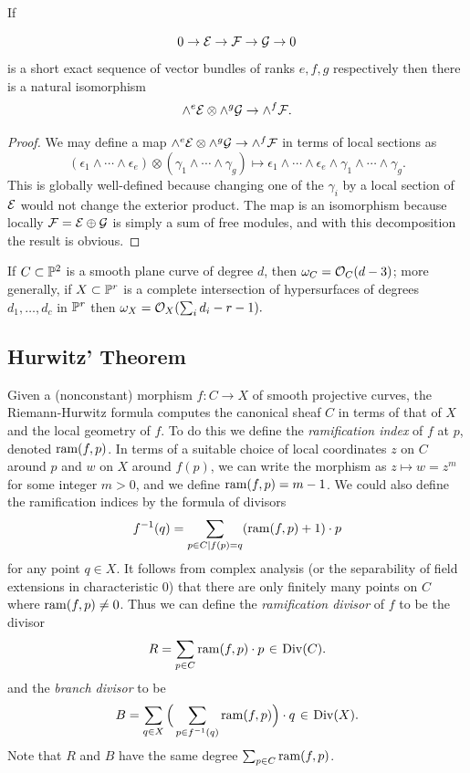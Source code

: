 \begin{lemma}\label{exterior powers}
 If 
\end{lemma}
$$
0\to {\mathcal E} \to {\mathcal F}\to {\mathcal G} \to 0
$$
is a short exact sequence of vector bundles of ranks $e,f,g$ respectively then there is a natural
isomorphism 
$$
\wedge^e{\mathcal E} \otimes \wedge^g {\mathcal G} \to \wedge^f{\mathcal F}.
$$
\begin{proof}
 We may define a map
$
\wedge^e{\mathcal E} \otimes \wedge^g {\mathcal G} \to \wedge^f{\mathcal F}
$
in terms of local sections as
$$
(\epsilon_1\wedge\cdots \wedge \epsilon_e) \otimes (\gamma_1\wedge\cdots\wedge \gamma_g)
\mapsto \epsilon_1\wedge\cdots \wedge \epsilon_e\wedge\gamma_1\wedge\cdots\wedge \gamma_g.
$$
This is globally well-defined because changing one of the $\gamma_i$ by a local section of ${\mathcal E}$ would not
change the exterior product. The map is an isomorphism because locally ${\mathcal F} = {\mathcal E}\oplus {\mathcal G}$ is
simply a sum of free modules, and with this
decomposition the result is obvious.
\end{proof}


\begin{corollary}\label{canonical of plane curve}
If $C\subset {\mathbb P}^{2}$ is a smooth plane curve of degree $d$, then $\omega_{C} = {\mathcal O}_{C}(d-3)$; more generally, if
$X\subset {\mathbb P}^{r}$ is a complete intersection of hypersurfaces of degrees $d_{1},\dots, d_{c}$ in ${\mathbb P}^r$ then
$\omega_{X} = {\mathcal O}_{X}(\sum_{i}d_{i }-r-1).$
\end{corollary}

\subsection{Hurwitz' Theorem}
 Given a (nonconstant) morphism $f : C \to X$ of smooth projective curves, the Riemann-Hurwitz formula computes the canonical sheaf  $C$ in terms of that of  $X$ and the local geometry of $f$. To do this we define the
\emph{ramification index} of $f$ at $p$,  denoted $\operatorname{ram}(f,p)$. In terms of a suitable choice of local coordinates $z$ on $C$ around $p$ and $w$ on $X$ around $f(p)$, we can write the morphism as $z \mapsto w = z^m$ for some integer $m > 0$, and we define $\operatorname{ram}(f,p) = m-1$. We could also define the ramification indices
by the formula of divisors
$$
 f^{-1}(q) = \sum_{p\in C \mid f(p)=q} (\operatorname{ram}(f,p)+1)\cdot p
 $$
 for any point $q \in X$.
It follows from complex analysis (or the separability of field extensions in characteristic 0) that there are only finitely many
points on $C$ where $\operatorname{ram}(f,p) \neq 0$. Thus we can define the \emph{ramification divisor} of $f$ to be the divisor
 $$
 R = \sum_{p \in C} \ram(f,p)\cdot p \; \in \;  \Div(C).
 $$
 and the \emph{branch divisor} to be
 $$
 B = \sum_{q \in X} \Big(\sum_{p \in f^{-1}(q)} \ram(f,p) \Big)\cdot q \; \in \; \Div(X).
 $$
 Note that $R$ and $B$ have the same degree $\sum_{p \in C} \operatorname{ram}(f,p)$. 

